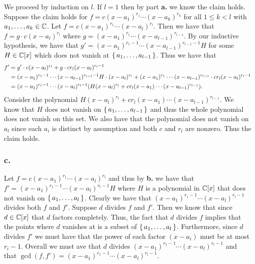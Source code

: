 \documentclass[letterpaper]{article}
\begin{document}
We proceed by induction on $l$.
If $l = 1$ then by part \textbf{a.} we know the claim holds.
Suppose the claim holds for $f = c(x - a_{1})^{r_{1}} \cdots (x - a_{k})^{r_{k}}$ for all $1 \leq k < l$ with $a_{1}, \ldots, a_{k} \in \mathbb{C}$.
Let $f = c(x - a_{1})^{r_{1}} \cdots (x - a_{l})^{r_{l}}$.
Then we have that $f = g \cdot c (x - a_{l})^{r_{l}}$ where $g = (x - a_{1})^{r_{1}} \cdots (x - a_{l - 1})^{r_{l - 1}}$.
By our inductive hypothesis, we have that $g' = (x - a_{1})^{r_{1} - 1} \cdots (x - a_{l - 1})^{r_{l - 1} - 1} H$ for some $H \in \mathbb{C}[x]$ which does not vanish at $\set{a_{1}, \ldots, a_{l -1}}$.
Thus we have that
\begin{align*}
  f' &= g' \cdot c (x - a_{l})^{r_{l}} + g \cdot c r_{l}(x - a_{l})^{r_{l} - 1} \\
     &= (x - a_{1})^{r_{1} - 1} \cdots (x - a_{l - 1})^{r_{l - 1} - 1} H \cdot (x - a_{l})^{r_{l}} + (x - a_{1})^{r_{1}} \cdots (x - a_{l - 1})^{r_{l - 1}} \cdot c r_{l}(x - a_{l})^{r_{l} - 1} \\
     &= (x - a_{1})^{r_{1} - 1} \cdots (x - a_{l})^{r_{l} - 1} \pqty{H(x - a_{l})^{r_{l}} + c r_{l}(x - a_{1}) \cdots (x - a_{l - 1})^{r_{l - 1}}}.
\end{align*}
Consider the polynomial $H(x - a_{l})^{r_{l}} + c r_{l}(x - a_{1}) \cdots (x - a_{l - 1})^{r_{l - 1}}$.
We know that $H$ does not vanish on $\set{a_{1}, \ldots, a_{l -1}}$ and thus the whole polynomial does not vanish on this set.
We also have that the polynomial does not vanish on $a_{l}$ since each $a_{i}$ is distinct by assumption and both $c$ and $r_{l}$ are nonzero.
Thus the claim holds.

\subsubsection*{c.}

Let $f = c(x - a_{1})^{r_{1}} \cdots (x - a_{l})^{r_{l}}$ and thus by \textbf{b.} we have that $f' = (x - a_{1})^{r_{1} - 1} \cdots (x - a_{l})^{r_{l} - 1} H$ where $H$ is a polynomial in $\mathbb{C}[x]$ that does not vanish on $\set{a_{1}, \ldots, a_{l}}$.
Clearly we have that $(x - a_{1})^{r_{1} - 1} \cdots (x - a_{l})^{r_{l} - 1}$ divides both $f$ and $f'$.
Suppose $d$ divides $f$ and $f'$.
Then we know that since $d \in \mathbb{C}[x]$ that $d$ factors completely.
Thus, the fact that $d$ divides $f$ implies that the points where $d$ vanishes at is a subset of $\set{a_{1}, \ldots, a_{l}}$.
Furthermore, since $d$ divides $f'$ we must have that the power of each factor $(x -a_{i})$ must be at most $r_{i} - 1$.
Overall we must ave that $d$ divides $(x - a_{1})^{r_{1} - 1} \cdots (x - a_{l})^{r_{l} - 1}$ and that $\gcd(f, f') = (x - a_{1})^{r_{1} - 1} \cdots (x - a_{l})^{r_{l} - 1}$.
\end{document}
